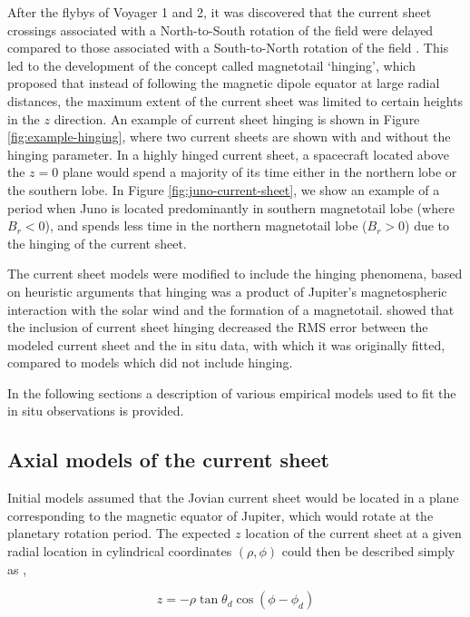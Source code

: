  After the flybys of Voyager 1 and 2, it was discovered that the current sheet crossings associated with a North-to-South rotation of the field were delayed compared to those associated with a South-to-North rotation of the field \cite{Behannon1981}. This led to the development of the concept called magnetotail `hinging', which proposed that instead of following the magnetic dipole equator at large radial distances, the maximum  extent of the current sheet was limited to certain heights in the $z$ direction. An example of current sheet hinging is shown in Figure \ref{fig:example-hinging}, where two current sheets are shown with and without the hinging parameter. In a highly hinged current sheet, a spacecraft located above the $z=0$ plane would spend a majority of its time either in the northern lobe or the southern lobe. In Figure \ref{fig:juno-current-sheet}, we show an example of a period when Juno is located predominantly in southern magnetotail lobe (where $B_r<0$), and spends less time in the northern magnetotail lobe ($B_r>0$) due to the hinging of the current sheet. 
 
The current sheet models were modified to include the hinging phenomena, based on heuristic arguments that hinging was a product of Jupiter's magnetospheric interaction with the solar wind and the formation of a magnetotail.  showed that the inclusion of current sheet hinging decreased the RMS error between the modeled current sheet and the in situ data, with which it was originally fitted, compared to models which did not include hinging. 
 
In the following sections a description of various empirical models used to fit the in situ observations is provided. 

\subsection{Axial models of the current sheet}
Initial models assumed that the Jovian current sheet would be located in a plane corresponding to the magnetic equator of Jupiter, which would rotate at the planetary rotation period. The expected $z$ location of the current sheet at a given radial location in cylindrical coordinates $(\rho, \phi)$ could then be described simply as \cite{VanAllen1974EnergeticJupiter,Goertz1976TheMagnetosphere},

\begin{equation}
    z = -\rho \tan\theta_d \cos\left(\phi - \phi_d\right)
\end{equation}

